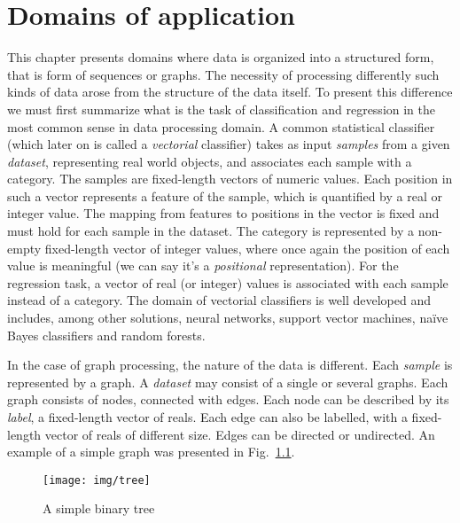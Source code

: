 
\chapter{Domains of application\label{chap:domains}}
This chapter presents domains where data is organized into a structured form, that is form of sequences or graphs. The necessity of processing differently such kinds of data arose from the structure of the data itself. To present this difference we must first summarize what is the task of classification and regression in the most common sense in data processing domain. A common statistical classifier (which later on is called a \emph{vectorial} classifier) takes as input \emph{samples} from a given \emph{dataset}, representing real world objects, and associates each sample with a category. The samples are fixed-length vectors of numeric values. Each position in such a vector represents a feature of the sample, which is quantified by a real or integer value. The mapping from features to positions in the vector is fixed and must hold for each sample in the dataset. The category is represented by a non-empty fixed-length vector of integer values, where once again the position of each value is meaningful (we can say it's a \emph{positional} representation). For the regression task, a vector of real (or integer) values is associated with each sample instead of a category. The domain of vectorial classifiers is well developed and includes, among other solutions, neural networks, support vector machines, naïve Bayes classifiers and random forests.

In the case of graph processing, the nature of the data is different. Each \emph{sample} is represented by a graph. A \emph{dataset} may consist of a single or several graphs. Each graph consists of nodes, connected with edges. Each node can be described by its \emph{label}, a fixed-length vector of reals. Each edge can also be labelled, with a fixed-length vector of reals of different size. Edges can be directed or undirected. An example of a simple graph was presented in Fig.~\ref{fig:simple_tree}.

\begin{figure}
\begin{center}
	\texttt{[image: img/tree]}
	\caption{A simple binary tree}
	\label{fig:simple_tree}
\end{center}
\end{figure}

